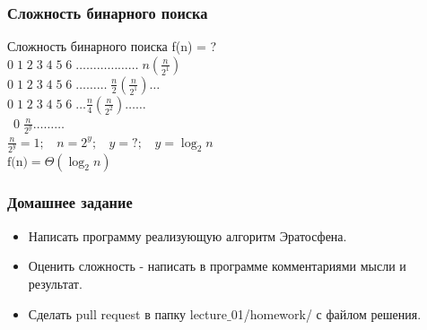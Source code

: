 \documentclass[russian, 12pt]{beamer}
\begin{document}
\begin{frame}[fragile]
\frametitle{Сложность бинарного поиска}
Сложность бинарного поиска f(n) = ?\\[0.3cm] \pause
$0\; 1\; 2\; 3\; 4\; 5\; 6\; \dots\dots\dots\dots\dots\dots \; n\left(\frac{n}{2^1}\right) $\\[0.3cm] \pause
$0\; 1\; 2\; 3\; 4\; 5\; 6\; \dots\dots\dots \;\frac{n}{2}\left(\frac{n}{2^1}\right)\dots$\\[0.3cm] \pause
$0\; 1\; 2\; 3\; 4\; 5\; 6\; \dots \frac{n}{4}\left(\frac{n}{2^2}\right)\dots\dots$\\[0.3cm] \
$0\;\frac{n}{2^y}\dots\dots\dots$\\[0.3cm] \pause
$\frac{n}{2^y} = 1;$\pause
$\;\;n = 2^y;$\pause
$\;\;y = ?;$\pause
$\;\;\boxed{y = \log_2n}$\\[0.3cm]\pause
$\boxed{\text{f(n)} = \Theta(\log_2n)}$
\end{frame}
\begin{frame}
\frametitle{Домашнее задание}
\begin{itemize}
  \item Написать программу реализующую алгоритм Эратосфена.
  \item Оценить сложность - написать в программе комментариями мысли и результат.
  \item Сделать pull request в папку lecture$\_$01/homework/ с файлом решения.
\end{itemize}
\end{frame}
\end{document}
